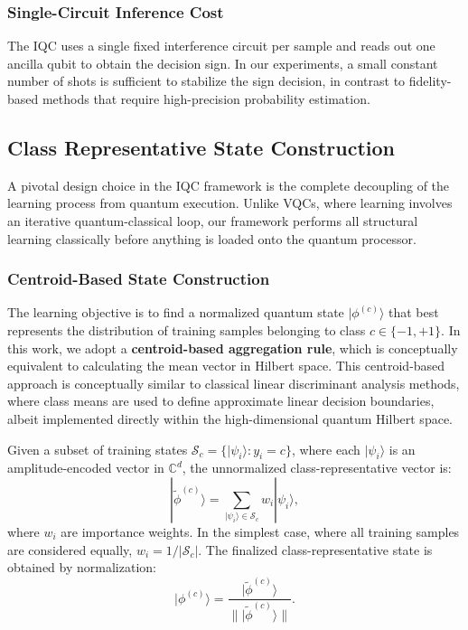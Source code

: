 \documentclass[conference]{IEEEtran}
\begin{document}
\subsubsection{Single-Circuit Inference Cost}
The IQC uses a single fixed interference circuit per sample and reads out one ancilla qubit to obtain the decision sign. In our experiments, a small constant number of shots is sufficient to stabilize the sign decision, in contrast to fidelity-based methods that require high-precision probability estimation.

\subsection{Class Representative State Construction}
\label{sec:centroids}
A pivotal design choice in the IQC framework is the complete decoupling of the learning process from quantum execution. Unlike VQCs, where learning involves an iterative quantum-classical loop, our framework performs all structural learning classically before anything is loaded onto the quantum processor.

\subsubsection{Centroid-Based State Construction}
The learning objective is to find a normalized quantum state $|\phi^{(c)}\rangle$ that best represents the distribution of training samples belonging to class $c \in \{-1, +1\}$. In this work, we adopt a \textbf{centroid-based aggregation rule}, which is conceptually equivalent to calculating the mean vector in Hilbert space. This centroid-based approach is conceptually similar to classical linear discriminant analysis methods, where class means are used to define approximate linear decision boundaries, albeit implemented directly within the high-dimensional quantum Hilbert space.

Given a subset of training states $\mathcal{S}_c = \{|\psi_i\rangle : y_i = c\}$, where each $|\psi_i\rangle$ is an amplitude-encoded vector in $\mathbb{C}^d$, the unnormalized class-representative vector is:
\begin{equation}
| \tilde{\phi}^{(c)} \rangle = \sum_{|\psi_i\rangle \in \mathcal{S}_c} w_i |\psi_i\rangle,
\end{equation}
where $w_i$ are importance weights. In the simplest case, where all training samples are considered equally, $w_i = 1/|\mathcal{S}_c|$. The finalized class-representative state is obtained by normalization:
\begin{equation}
|\phi^{(c)}\rangle = \frac{| \tilde{\phi}^{(c)} \rangle}{\| | \tilde{\phi}^{(c)} \rangle \|}.
\end{equation}
\end{document}
